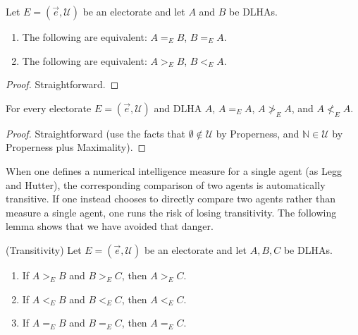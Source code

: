 \documentclass[twoside,11pt]{article}
\begin{document}
\begin{lemma}
    Let $E=(\vec{e},\mathscr U)$ be an electorate and let $A$ and $B$ be DLHAs.
    \begin{enumerate}
        \item The following are equivalent: $A=_{E}B$, $B=_{E}A$.
        \item The following are equivalent: $A>_{E}B$, $B<_{E}A$.
    \end{enumerate}
\end{lemma}

\begin{proof}
Straightforward.
\end{proof}

\begin{lemma}
    For every electorate $E=(\vec{e},\mathscr U)$ and DLHA $A$,
    $A=_{E}A$, $A\not>_{E}A$, and $A\not<_{E}A$.
\end{lemma}

\begin{proof}
    Straightforward (use the facts that $\emptyset\not\in\mathscr U$ by Properness,
    and $\mathbb N\in\mathscr U$ by Properness plus Maximality).
\end{proof}

When one defines a numerical intelligence measure for a single agent (as Legg and Hutter),
the corresponding comparison of two agents is automatically transitive.
If one instead chooses to directly compare two agents rather than measure a single agent,
one runs the risk of losing transitivity. The following lemma shows that we have
avoided that danger.


\begin{lemma}
\label{transitivityLemma}
    (Transitivity)
    Let $E=(\vec{e},\mathscr U)$ be an electorate and let $A,B,C$ be DLHAs.
    \begin{enumerate}
        \item If $A>_{E}B$ and $B>_{E}C$, then $A>_{E}C$.
        \item If $A<_{E}B$ and $B<_{E}C$, then $A<_{E}C$.
        \item If $A=_{E}B$ and $B=_{E}C$, then $A=_{E}C$.
    \end{enumerate}
\end{lemma}
\end{document}
